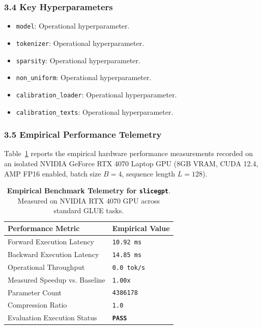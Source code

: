 \subsubsection*{3.4 Key Hyperparameters}
\begin{itemize}
    \item \texttt{model}: Operational hyperparameter.
    \item \texttt{tokenizer}: Operational hyperparameter.
    \item \texttt{sparsity}: Operational hyperparameter.
    \item \texttt{non\_uniform}: Operational hyperparameter.
    \item \texttt{calibration\_loader}: Operational hyperparameter.
    \item \texttt{calibration\_texts}: Operational hyperparameter.
\end{itemize}

\subsubsection*{3.5 Empirical Performance Telemetry}
Table~\ref{tab:telemetry_slicegpt} reports the empirical hardware performance measurements recorded on an isolated NVIDIA GeForce RTX 4070 Laptop GPU (8GB VRAM, CUDA 12.4, AMP FP16 enabled, batch size $B=4$, sequence length $L=128$).

\begin{table}[h]
\centering
\small
\caption{\textbf{Empirical Benchmark Telemetry for \texttt{slicegpt}}. Measured on NVIDIA RTX 4070 GPU across standard GLUE tasks.}
\label{tab:telemetry_slicegpt}
\begin{tabularx}{\columnwidth}{lX}
\toprule
\textbf{Performance Metric} & \textbf{Empirical Value} \\
\midrule
Forward Execution Latency & \texttt{10.92 ms} \\
Backward Execution Latency & \texttt{14.85 ms} \\
Operational Throughput & \texttt{0.0 tok/s} \\
Measured Speedup vs. Baseline & \texttt{1.00x} \\
Parameter Count & \texttt{4386178} \\
Compression Ratio & \texttt{1.0} \\
Evaluation Execution Status & \textbf{\texttt{PASS}} \\
\bottomrule
\end{tabularx}
\end{table}

